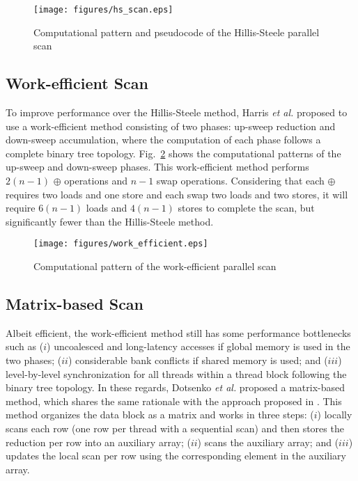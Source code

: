 \documentclass[article]{elsarticle}
\renewcommand{\hl}[1]{#1}
\begin{document}
{\begin{figure}[!h]
\centering
\begin{minipage}[c]{0.3\linewidth}
\centering
\texttt{[image: figures/hs\_scan.eps]}
\end{minipage}
\begin{minipage}[c]{0.68\linewidth}
\centering
\hsscankernel
\end{minipage}
\caption{Computational pattern and pseudocode of the Hillis-Steele parallel scan}
\label{fig:hs_scan}
\end{figure}
\subsection{Work-efficient Scan}
\label{sec:work_efficient}
To improve performance over the Hillis-Steele method, Harris \textit{et al.} \cite{harris2007parallel} proposed to use a work-efficient method consisting of two phases: up-sweep reduction and down-sweep accumulation, where the computation of each phase follows a complete binary tree topology. Fig.~\ref{fig:work_efficient} shows the computational patterns of the up-sweep and down-sweep phases. This work-efficient method performs \mbox{$2(n-1)$} $\oplus$ operations and \mbox{$n-1$} swap operations. Considering that each $\oplus$ requires two loads and one store and each swap two loads and two stores, it will require \mbox{$6(n-1)$} loads and \mbox{$4(n-1)$} stores to complete the scan, but significantly fewer than the Hillis-Steele method.
\begin{figure}[!h]
\centering
\texttt{[image: figures/work\_efficient.eps]}
\caption{Computational pattern of the work-efficient parallel scan}
\label{fig:work_efficient}
\end{figure}
\subsection{Matrix-based Scan}
\label{sec:matrix_scan}
Albeit efficient, the work-efficient method still has some performance bottlenecks such as ($i$) uncoalesced and long-latency accesses if global memory is used in the two phases; ($ii$) considerable bank conflicts if shared memory is used; and ($iii$) level-by-level synchronization for all threads within a thread block following the binary tree topology. In these regards, Dotsenko \textit{et al.} \cite{dotsenko2008fast} proposed a matrix-based method, \hl{which shares the same rationale with the approach proposed in \cite{blelloch1989scans}}. This method organizes the data block as a matrix and works in three steps: ($i$) locally scans each row (one row per thread with a sequential scan) and then stores the reduction per row into an auxiliary array; ($ii$) scans the auxiliary array; and ($iii$) updates the local scan per row using the corresponding element in the auxiliary array.

}
\end{document}
